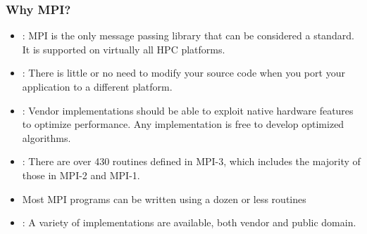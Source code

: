 \documentclass[10pt,t]{beamer}
\begin{document}
\begin{frame}
  \frametitle{Why MPI?}
  \begin{itemize}
    \item {}: MPI is the only message passing library that can be considered a standard. It is supported on virtually all HPC platforms.
    \item {}: There is little or no need to modify your source code when you port your application to a different platform.
    \item {}: Vendor implementations should be able to exploit native hardware features to optimize performance. Any implementation is free to develop optimized algorithms.
    \item {}: There are over 430 routines defined in MPI-3, which includes the majority of those in MPI-2 and MPI-1.
    \item[] Most MPI programs can be written using a dozen or less routines
    \item {}: A variety of implementations are available, both vendor and public domain.
  \end{itemize}
\end{frame}
\end{document}
